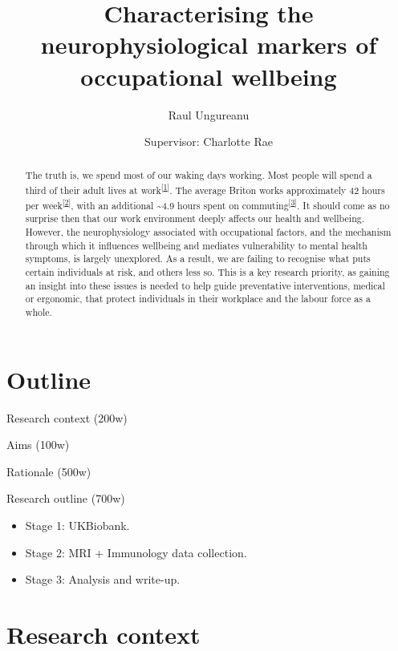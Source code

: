 \documentclass[]{article}
\title{\textbf{Characterising the neurophysiological markers of occupational wellbeing}}
\author{Raul Ungureanu \and Supervisor: Charlotte Rae}
\date{}
\begin{document}
\maketitle
\begin{abstract}
The truth is, we spend most of our waking days working. Most people will spend a third of their adult lives at work\textsuperscript{{[}\protect\hyperlink{ref-WHO1995}{1}{]}}. The average Briton works approximately 42 hours per week\textsuperscript{{[}\protect\hyperlink{ref-TUC1}{2}{]}}, with an additional \textasciitilde{}4.9 hours spent on commuting\textsuperscript{{[}\protect\hyperlink{ref-TUC2}{3}{]}}. It should come as no surprise then that our work environment deeply affects our health and wellbeing. However, the neurophysiology associated with occupational factors, and the mechanism through which it influences wellbeing and mediates vulnerability to mental health symptoms, is largely unexplored. As a result, we are failing to recognise what puts certain individuals at risk, and others less so. This is a key research priority, as gaining an insight into these issues is needed to help guide preventative interventions, medical or ergonomic, that protect individuals in their workplace and the labour force as a whole.
\end{abstract}

\newpage

\hypertarget{outline}{%
\section{Outline}\label{outline}}

Research context (200w)

Aims (100w)

Rationale (500w)

Research outline (700w)

\begin{itemize}
\item
  Stage 1: UKBiobank.
\item
  Stage 2: MRI + Immunology data collection.
\item
  Stage 3: Analysis and write-up.
\end{itemize}

\hypertarget{research-context}{%
\section{Research context}\label{research-context}}
\end{document}
